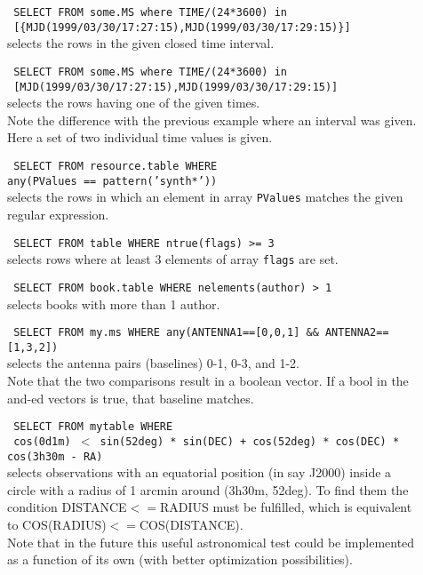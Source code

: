 \begin{description}
   \item[] \texttt{ SELECT FROM some.MS where TIME/(24*3600) in }
     \\\texttt{ [\{MJD(1999/03/30/17:27:15),MJD(1999/03/30/17:29:15)\}] }
     \\selects the rows in the given closed time interval.

   \item[] \texttt{ SELECT FROM some.MS where TIME/(24*3600) in }
     \\\texttt{ [MJD(1999/03/30/17:27:15),MJD(1999/03/30/17:29:15)] }
     \\selects the rows having one of the given times.
     \\Note the difference with the previous example where an interval
     was given. Here a set of two individual time values is given.

  \item[] \texttt{ SELECT FROM resource.table WHERE}
     \\\texttt{any(PValues == pattern('synth*'))}
     \\selects the rows in which an element in array
     \texttt{PValues} matches the given regular expression.

  \item[] \texttt{ SELECT FROM table WHERE ntrue(flags) >= 3}
     \\selects rows where at least 3 elements of array \texttt{flags}
     are set.

  \item[] \texttt{ SELECT FROM book.table WHERE nelements(author) > 1}
     \\selects books with more than 1 author.

  \item[] \texttt{ SELECT FROM my.ms WHERE
         any(ANTENNA1==[0,0,1] \&\& ANTENNA2==[1,3,2])}
     \\selects the antenna pairs (baselines) 0-1, 0-3, and 1-2.
     \\Note that the two comparisons result in a boolean vector. If
       a bool in the and-ed vectors is true, that baseline matches.

  \item[] \texttt{ SELECT FROM mytable WHERE}
     \\\texttt{ cos(0d1m) $<$
         sin(52deg) * sin(DEC) + cos(52deg) * cos(DEC) *
         cos(3h30m - RA) }
     \\selects observations with an equatorial position (in say J2000)
     inside a circle with a radius of 1 arcmin around (3h30m, 52deg).
     To find them the condition DISTANCE$<=$RADIUS must be fulfilled,
     which is equivalent to COS(RADIUS)$<=$COS(DISTANCE).
     \\Note that in the future this useful astronomical test could
     be implemented as a function of its own (with better optimization
     possibilities).


\end{description}
